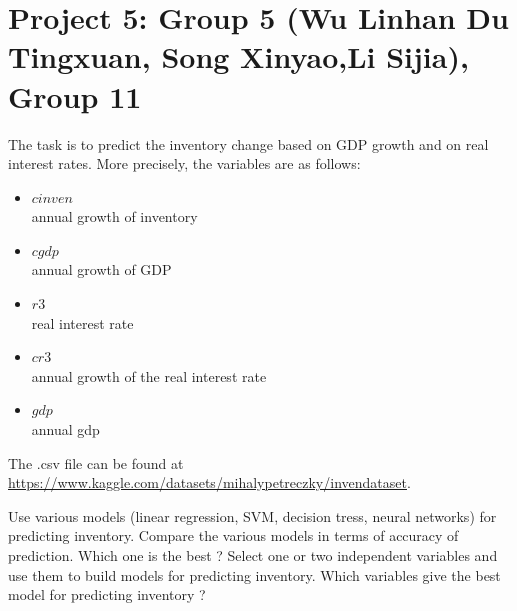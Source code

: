 \documentclass{article}
\begin{document}
   

 
\section*{Project 5: Group 5 (Wu Linhan Du Tingxuan, Song Xinyao,Li Sijia), Group 11  }

  The task is to predict the inventory change based on GDP growth and on real interest rates. More precisely, the variables are as follows:
  \begin{itemize}
  \item{$cinven$\\}  annual growth of inventory
  \item{$cgdp$\\}    annual growth of GDP %
  \item{$r3$\\}      real interest rate      
  \item{$cr3$\\}     annual growth of the real interest rate      
  \item{$gdp$\\}     annual gdp      
 \end{itemize}

 The .csv file can be found at \url{https://www.kaggle.com/datasets/mihalypetreczky/invendataset}. 
   
  Use various models (linear regression, SVM, decision tress, neural networks) for predicting inventory. Compare the various models in terms of accuracy of prediction. Which one is the best ? 
   Select one or two independent variables  and use them to build models for predicting inventory.
Which variables give the best model for predicting  inventory  ?  



\end{document}
